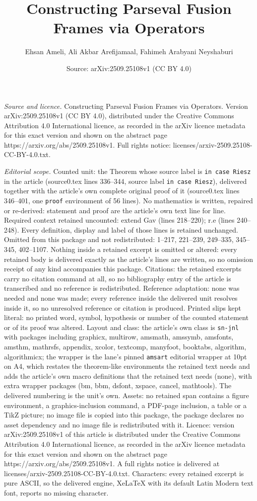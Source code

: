 \documentclass[10pt,a4paper]{amsart}
\title[Constructing Parseval Fusion Frames via Operators]{Constructing Parseval Fusion Frames via Operators}
\author{Ehsan Ameli, Ali Akbar Arefijamaal, Fahimeh Arabyani Neyshaburi}
\date{Source: arXiv:2509.25108v1 (CC BY 4.0)}
\begin{document}
\maketitle

\noindent\emph{Source and licence.} Constructing Parseval Fusion Frames via Operators. Version arXiv:2509.25108v1 (CC BY 4.0), distributed under the Creative Commons Attribution 4.0 International licence, as recorded in the arXiv licence metadata for this exact version and shown on the abstract page https://arxiv.org/abs/2509.25108v1. Full rights notice: licenses/arxiv-2509.25108-CC-BY-4.0.txt.\par\smallskip

\noindent\textit{Editorial scope.} Counted unit: the Theorem whose source label is \texttt{in case Riesz} in the article (source0.tex lines 336--344, source label \texttt{in case Riesz}), delivered together with the article's own complete original proof of it (source0.tex lines 346--401, one \texttt{proof} environment of 56 lines). No mathematics is written, repaired or re-derived: statement and proof are the article's own text line for line. Required context retained uncounted: extend Gav (lines 218--220); r.e (lines 240--248). Every definition, display and label of those lines is retained unchanged. Omitted from this package and not redistributed: 1--217, 221--239, 249--335, 345--345, 402--1107. Nothing inside a retained excerpt is omitted or altered: every retained body is delivered exactly as the article's lines are written, so no omission receipt of any kind accompanies this package. Citations: the retained excerpts carry no citation command at all, so no bibliography entry of the article is transcribed and no reference is redistributed. Reference adaptation: none was needed and none was made; every reference inside the delivered unit resolves inside it, so no unresolved reference or citation is produced. Printed slips kept literal: no printed word, symbol, hypothesis or number of the counted statement or of its proof was altered. Layout and class: the article's own class is \texttt{sn-jnl} with packages including graphicx, multirow, amsmath, amssymb, amsfonts, amsthm, mathrsfs, appendix, xcolor, textcomp, manyfoot, booktabs, algorithm, algorithmicx; the wrapper is the lane's pinned \texttt{amsart} editorial wrapper at 10pt on A4, which restates the theorem-like environments the retained text needs and adds the article's own macro definitions that the retained text needs (none), with extra wrapper packages (bm, bbm, dsfont, xspace, cancel, mathtools). The delivered numbering is the unit's own. Assets: no retained span contains a figure environment, a graphics-inclusion command, a PDF-page inclusion, a table or a TikZ picture; no image file is copied into this package, the package declares no asset dependency and no image file is redistributed with it. Licence: version arXiv:2509.25108v1 of this article is distributed under the Creative Commons Attribution 4.0 International licence, as recorded in the arXiv licence metadata for this exact version and shown on the abstract page https://arxiv.org/abs/2509.25108v1. A full rights notice is delivered at licenses/arxiv-2509.25108-CC-BY-4.0.txt. Characters: every retained excerpt is pure ASCII, so the delivered engine, XeLaTeX with its default Latin Modern text font, reports no missing character.
\end{document}

